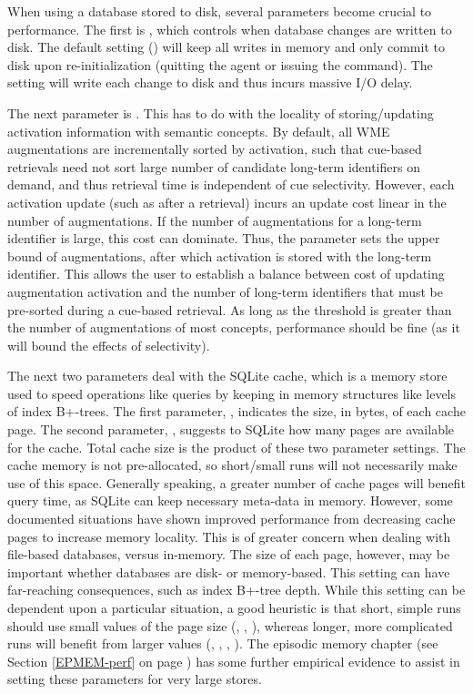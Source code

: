 When using a database stored to disk, several parameters become crucial to performance.  The first is , which controls when database changes are written to disk.   The default setting () will keep all writes in memory and only commit to disk upon re-initialization (quitting the agent or issuing the  command).  The  setting will write each change to disk and thus incurs massive I/O delay.

The next parameter is . This has to do with the locality of storing/updating activation information with semantic concepts. By default, all WME augmentations are incrementally sorted by activation, such that cue-based retrievals need not sort large number of candidate long-term identifiers on demand, and thus retrieval time is independent of cue selectivity. However, each activation update (such as after a retrieval) incurs an update cost linear in the number of augmentations. If the number of augmentations for a long-term identifier is large, this cost can dominate. Thus, the  parameter sets the upper bound of augmentations, after which activation is stored with the long-term identifier. This allows the user to establish a balance between cost of updating augmentation activation and the number of long-term identifiers that must be pre-sorted during a cue-based retrieval. As long as the threshold is greater than the number of augmentations of most concepts, performance should be fine (as it will bound the effects of selectivity).

The next two parameters deal with the SQLite cache, which is a memory store used to speed operations like queries by keeping in memory structures like levels of index B+-trees. The first parameter, , indicates the size, in bytes, of each cache page. The second parameter, , suggests to SQLite how many pages are available for the cache. Total cache size is the product of these two parameter settings. The cache memory is not pre-allocated, so short/small runs will not necessarily make use of this space. Generally speaking, a greater number of cache pages will benefit query time, as SQLite can keep necessary meta-data in memory. However, some documented situations have shown improved performance from decreasing cache pages to increase memory locality. This is of greater concern when dealing with file-based databases, versus in-memory. The size of each page, however, may be important whether databases are disk- or memory-based. This setting can have far-reaching consequences, such as index B+-tree depth. While this setting can be dependent upon a particular situation, a good heuristic is that short, simple runs should use small values of the page size (, , ), whereas longer, more complicated runs will benefit from larger values (, , , ). The episodic memory chapter (see Section \ref{EPMEM-perf} on page \pageref{EPMEM-perf}) has some further empirical evidence to assist in setting these parameters for very large stores.

